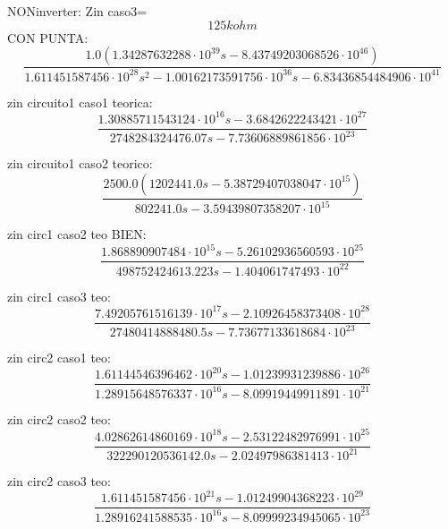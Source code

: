 NONinverter: Zin caso3=
\begin{equation}
125kohm
\end{equation}
CON PUNTA:
\begin{equation}
\frac{1.0 \left(1.34287632288 \cdot 10^{39} s - 8.43749203068526 \cdot 10^{46}\right)}{1.611451587456 \cdot 10^{28} s^{2} - 1.00162173591756 \cdot 10^{36} s - 6.83436854484906 \cdot 10^{41}}
\end{equation}

zin circuito1 caso1 teorica:
\begin{equation}
\frac{1.30885711543124 \cdot 10^{16} s - 3.6842622243421 \cdot 10^{27}}{2748284324476.07 s - 7.73606889861856 \cdot 10^{23}}
\end{equation}

zin circuito1 caso2 teorico:
\begin{equation}
\frac{2500.0 \left(1202441.0 s - 5.38729407038047 \cdot 10^{15}\right)}{802241.0 s - 3.59439807358207 \cdot 10^{15}}
\end{equation}

zin circ1 caso2 teo BIEN:
\begin{equation}
\frac{1.868890907484 \cdot 10^{15} s - 5.26102936560593 \cdot 10^{25}}{498752424613.223 s - 1.404061747493 \cdot 10^{22}}
\end{equation}

zin circ1 caso3 teo:
\begin{equation}
\frac{7.49205761516139 \cdot 10^{17} s - 2.10926458373408 \cdot 10^{28}}{27480414888480.5 s - 7.73677133618684 \cdot 10^{23}}
\end{equation}


zin circ2 caso1 teo:
\begin{equation}
\frac{1.61144546396462 \cdot 10^{20} s - 1.01239931239886 \cdot 10^{26}}{1.28915648576337 \cdot 10^{16} s - 8.09919449911891 \cdot 10^{21}}
\end{equation}

zin circ2 caso2 teo:
\begin{equation}
\frac{4.02862614860169 \cdot 10^{18} s - 2.53122482976991 \cdot 10^{25}}{322290120536142.0 s - 2.02497986381413 \cdot 10^{21}}
\end{equation}


zin circ2 caso3 teo:
\begin{equation}
\frac{1.611451587456 \cdot 10^{21} s - 1.01249904368223 \cdot 10^{29}}{1.28916241588535 \cdot 10^{16} s - 8.09999234945065 \cdot 10^{23}}
\end{equation}

